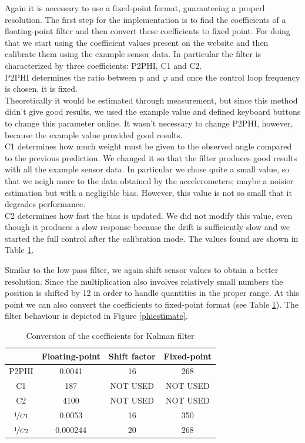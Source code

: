 \documentclass[11pt]{article}
\begin{document}
Again it is necessary to use a fixed-point format,
guaranteeing a properl resolution. The first step for the implementation
is to find the coefficients of a floating-point filter and then convert
these coefficients to fixed point. For doing that we start using the
coefficient values present on the website and then calibrate them
using the example sensor data. In particular the filter is characterized
by three coefficients: P2PHI, C1 and C2.\\
P2PHI determines the ratio between p and $\varphi$ and
once the control loop frequency is chosen, it is fixed.\\
Theoretically it would be estimated through measurement, but since
this method didn't give good results, we used the example value and
defined keyboard buttons to change this parameter online.
It wasn't necessary to change P2PHI, however, because the example value provided
good results.\\
C1 determines how much weight must be given to the observed angle
compared to the previous prediction. We changed it so that the filter
produces good results with all the example sensor data. In particular
we chose quite a small value, so that we neigh more to the
data obtained by the accelerometers; maybe a noisier estimation but with a negligible
bias. However, this value is not so small that it degrades performance.\\
C2 determines how fast the bias is updated. We did not modify this
value, even though it produces a slow response because the drift is sufficiently
slow and we started the full control after the calibration mode. The
values found are shown in Table \ref{karmelcoeff}.

Similar to the low pass filter, 
we again shift sensor values to obtain a better resolution. Since
the multiplication also involves relatively small numbers the position is shifted by 12
in order to handle quantities in the proper range. At this point
we can also convert the coefficients to fixed-point format (see Table \ref{karmelcoeff}).
The filter behaviour is depicted in Figure \ref{phiestimate}.
%
\begin{table}[h]
\centering

\begin{tabular}{|c|c|c|c|}
\hline 
 & Floating-point & Shift factor & Fixed-point\tabularnewline
\hline 
P2PHI & 0.0041 & 16 & 268\tabularnewline
\hline 
C1 & 187 & NOT USED & NOT USED\tabularnewline
\hline 
C2 & 4100 & NOT USED & NOT USED\tabularnewline
\hline 
$\nicefrac{1}{C1}$ & 0.0053 & 16 & 350\tabularnewline
\hline 
$\nicefrac{1}{C2}$ & 0.000244 & 20 & 268\tabularnewline
\hline
\end{tabular}

\caption{Conversion of the coefficients for Kalman filter}
\label{karmelcoeff}
\end{table}
\end{document}
